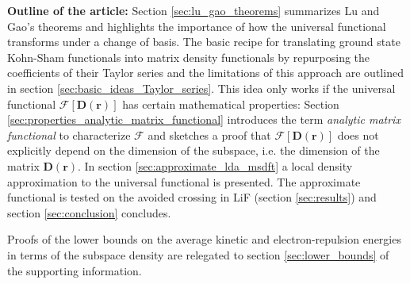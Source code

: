 \documentclass[journal=jpclcd,manuscript=letter]{achemso}
\newcommand\m[1]{\mathbf{#1}}
\renewcommand\vec[1]{\mathbf{#1}}
\begin{document}
\textbf{Outline of the article:} Section \ref{sec:lu_gao_theorems} summarizes Lu and Gao's theorems and highlights
the importance of how the universal functional transforms under a change of basis.
The basic recipe for translating ground state Kohn-Sham functionals into matrix density functionals by repurposing
the coefficients of their Taylor series and the limitations of this approach are outlined in section \ref{sec:basic_ideas_Taylor_series}.
This idea only works if the universal functional $\m{\mathcal{F}}[\m{D}(\vec{r})]$ has certain mathematical properties: 
Section \ref{sec:properties_analytic_matrix_functional} introduces the term \emph{analytic matrix functional} to characterize $\m{\mathcal{F}}$
and sketches a proof that $\m{\mathcal{F}}[\m{D}(\vec{r})]$ does not explicitly depend on the dimension of the subspace,
i.e. the dimension of the matrix $\m{D}(\vec{r})$.
In section \ref{sec:approximate_lda_msdft} a local density approximation to the universal functional is presented.
The approximate functional is tested on the avoided crossing in LiF (section \ref{sec:results}) and section \ref{sec:conclusion} concludes.

Proofs of the lower bounds on the average kinetic and electron-repulsion energies in terms of the subspace density are relegated to section
\ref{sec:lower_bounds} of the supporting information.
\end{document}
